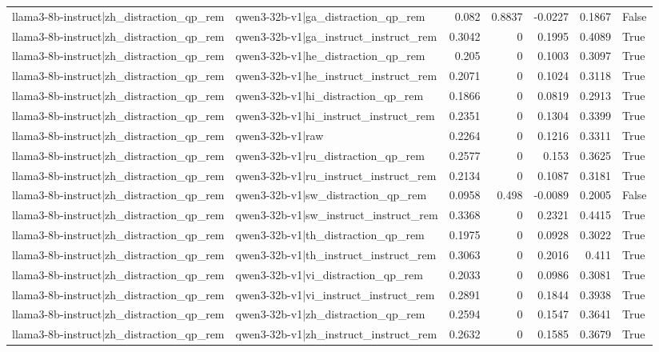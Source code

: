 \begin{table}
\begin{tabular}{l l r r r r l}
llama3-8b-instruct|zh_distraction_qp_rem & qwen3-32b-v1|ga_distraction_qp_rem & 0.082 & 0.8837 & -0.0227 & 0.1867 & False \\
llama3-8b-instruct|zh_distraction_qp_rem & qwen3-32b-v1|ga_instruct_instruct_rem & 0.3042 & 0 & 0.1995 & 0.4089 & True \\
llama3-8b-instruct|zh_distraction_qp_rem & qwen3-32b-v1|he_distraction_qp_rem & 0.205 & 0 & 0.1003 & 0.3097 & True \\
llama3-8b-instruct|zh_distraction_qp_rem & qwen3-32b-v1|he_instruct_instruct_rem & 0.2071 & 0 & 0.1024 & 0.3118 & True \\
llama3-8b-instruct|zh_distraction_qp_rem & qwen3-32b-v1|hi_distraction_qp_rem & 0.1866 & 0 & 0.0819 & 0.2913 & True \\
llama3-8b-instruct|zh_distraction_qp_rem & qwen3-32b-v1|hi_instruct_instruct_rem & 0.2351 & 0 & 0.1304 & 0.3399 & True \\
llama3-8b-instruct|zh_distraction_qp_rem & qwen3-32b-v1|raw & 0.2264 & 0 & 0.1216 & 0.3311 & True \\
llama3-8b-instruct|zh_distraction_qp_rem & qwen3-32b-v1|ru_distraction_qp_rem & 0.2577 & 0 & 0.153 & 0.3625 & True \\
llama3-8b-instruct|zh_distraction_qp_rem & qwen3-32b-v1|ru_instruct_instruct_rem & 0.2134 & 0 & 0.1087 & 0.3181 & True \\
llama3-8b-instruct|zh_distraction_qp_rem & qwen3-32b-v1|sw_distraction_qp_rem & 0.0958 & 0.498 & -0.0089 & 0.2005 & False \\
llama3-8b-instruct|zh_distraction_qp_rem & qwen3-32b-v1|sw_instruct_instruct_rem & 0.3368 & 0 & 0.2321 & 0.4415 & True \\
llama3-8b-instruct|zh_distraction_qp_rem & qwen3-32b-v1|th_distraction_qp_rem & 0.1975 & 0 & 0.0928 & 0.3022 & True \\
llama3-8b-instruct|zh_distraction_qp_rem & qwen3-32b-v1|th_instruct_instruct_rem & 0.3063 & 0 & 0.2016 & 0.411 & True \\
llama3-8b-instruct|zh_distraction_qp_rem & qwen3-32b-v1|vi_distraction_qp_rem & 0.2033 & 0 & 0.0986 & 0.3081 & True \\
llama3-8b-instruct|zh_distraction_qp_rem & qwen3-32b-v1|vi_instruct_instruct_rem & 0.2891 & 0 & 0.1844 & 0.3938 & True \\
llama3-8b-instruct|zh_distraction_qp_rem & qwen3-32b-v1|zh_distraction_qp_rem & 0.2594 & 0 & 0.1547 & 0.3641 & True \\
llama3-8b-instruct|zh_distraction_qp_rem & qwen3-32b-v1|zh_instruct_instruct_rem & 0.2632 & 0 & 0.1585 & 0.3679 & True \\

\end{tabular}
\end{table}
